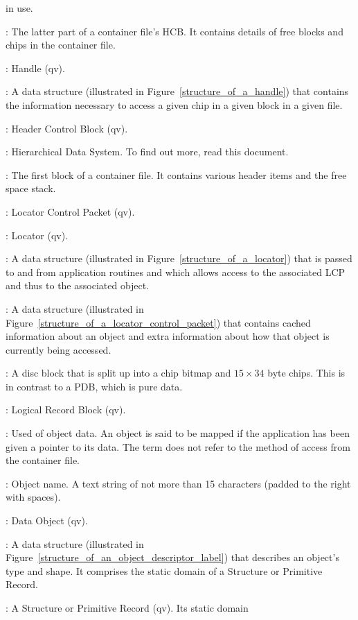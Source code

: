 \begin {description}
in use.                 
\item [Free Space Stack]: The latter part of a container file's HCB. It
contains details of free blocks and chips in the container file.
\item [HAN]: Handle (qv).
\item [Handle]: A data structure (illustrated in
Figure~\ref{structure_of_a_handle}) that contains the information necessary
to access a given chip in a given block in a given file.
\item [HCB]: Header Control Block (qv).
\item [HDS]: Hierarchical Data System. To find out more, read this document.
\item [Header Control Block]: The first block of a container file. It contains
various header items and the free space stack.
\item [LCP]: Locator Control Packet (qv).
\item [LOC]: Locator (qv).
\item [Locator]: A data structure (illustrated in
Figure~\ref{structure_of_a_locator}) that is passed to and from application
routines and which allows access to the associated LCP and thus to the
associated object.
\item [Locator Control Packet]: A data structure (illustrated in
Figure~\ref{structure_of_a_locator_control_packet}) that contains cached
information about an object and extra information about how that object is
currently being accessed. 
\item [Logical Record Block]: A disc block that is split up into a chip bitmap
and $15 \times 34$ byte chips. This is in contrast to a PDB, which is pure
data.
\item [LRB]: Logical Record Block (qv).
\item [Mapped]: Used of object data. An object is said to be mapped if the
application has been given a pointer to its data. The term does not refer
to the method of access from the container file.
\item [Name]: Object name. A text string of not more than 15 characters
(padded to the right with spaces).
\item [Object]: Data Object (qv).
\item [Object Descriptor Label]: A data structure (illustrated in
Figure~\ref{structure_of_an_object_descriptor_label}) that describes an object's
type and shape. It comprises the static domain of a Structure or Primitive
Record.
\item [Object Record]: A Structure or Primitive Record (qv). Its static domain

\end{description}
